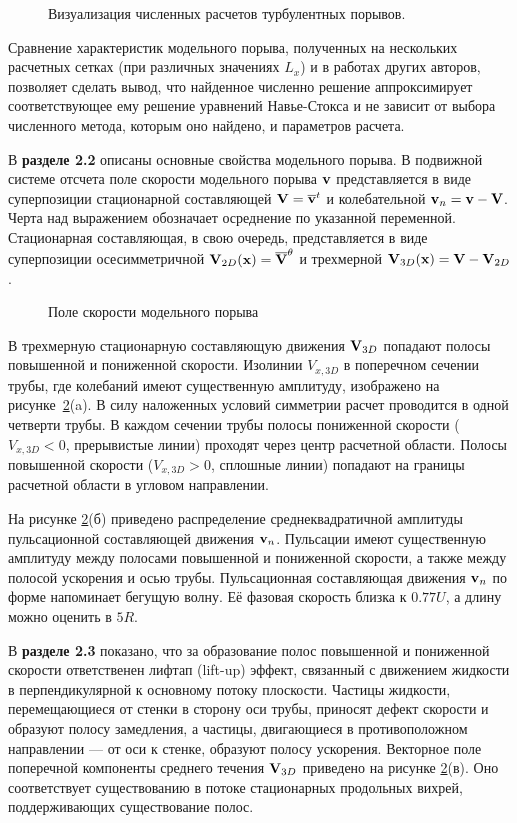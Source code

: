 \begin{figure}[h]
\caption{Визуализация численных расчетов турбулентных порывов.}
\label{3D_img}
\end{figure}


Сравнение характеристик модельного порыва, полученных на нескольких расчетных сетках (при различных значениях $L_x$) и в работах других авторов, позволяет сделать вывод, что найденное численно решение аппроксимирует соответствующее ему решение уравнений Навье-Стокса и не зависит от выбора численного метода, которым оно найдено, и параметров расчета. 


В \textbf{разделе 2.2} описаны основные свойства модельного порыва. В подвижной системе отсчета поле скорости модельного порыва $\mathbf{v}$ представляется в виде суперпозиции стационарной составляющей $\mathbf{V} = \overline{\mathbf{v}}^t$ и колебательной $\mathbf{v}_n = \mathbf{v} - \mathbf{V}$. Черта над выражением обозначает осреднение по указанной переменной. Стационарная составляющая, в свою очередь, представляется в виде суперпозиции осесимметричной $\mathbf{V}_{2D}(\mathbf{x}) = \overline{\mathbf{V}}^{\theta}$ и трехмерной $\mathbf{V}_{3D}(\mathbf{x}) = \mathbf{V} - \mathbf{V}_{2D}$. 

\begin{figure}[h]
\caption{Поле скорости модельного порыва}
\label{mp_cs_pic}
\end{figure}

В трехмерную стационарную составляющую движения $\mathbf{V}_{3D}$ попадают полосы повышенной и пониженной скорости. Изолинии $V_{x, 3D}$ в поперечном сечении трубы, где колебаний имеют существенную амплитуду, изображено на рисунке~\ref{mp_cs_pic}(a). В силу наложенных условий симметрии расчет проводится в одной четверти трубы. В каждом сечении трубы полосы пониженной скорости ($V_{x,3D} < 0$, прерывистые линии) проходят через центр расчетной области. Полосы повышенной скорости ($V_{x,3D} > 0$, сплошные линии) попадают на границы расчетной области в угловом направлении. 

На рисунке \ref{mp_cs_pic}(б) приведено распределение среднеквадратичной амплитуды пульсационной составляющей движения $\mathbf{v}_n$. Пульсации имеют существенную амплитуду между полосами повышенной и пониженной скорости, а также между полосой ускорения и осью трубы. Пульсационная составляющая движения $\mathbf{v}_n$ по форме напоминает бегущую волну. Её фазовая скорость близка к $0.77U$, а длину можно оценить в $5R$. 

В \textbf{разделе 2.3} показано, что за образование полос повышенной и пониженной скорости ответственен лифтап (lift-up) эффект, связанный с движением жидкости в перпендикулярной к основному потоку плоскости. Частицы жидкости, перемещающиеся от стенки в сторону оси трубы, приносят дефект скорости и образуют полосу замедления, а частицы, двигающиеся в противоположном направлении --- от оси к стенке, образуют полосу ускорения.
Векторное поле поперечной компоненты среднего течения $\mathbf{V}_{3D}$ приведено на рисунке \ref{mp_cs_pic}(в). Оно соответствует существованию в потоке стационарных продольных вихрей, поддерживающих существование полос. 

